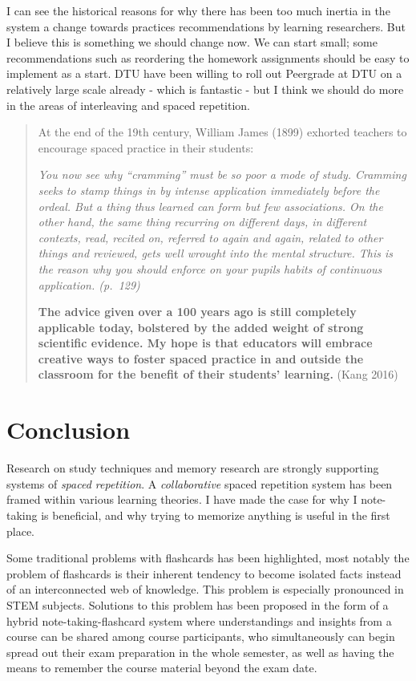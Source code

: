 I can see the historical reasons for why there has been too much inertia
in the system a change towards practices recommendations by learning
researchers. But I believe this is something we should change now. We
can start small; some recommendations such as reordering the homework
assignments should be easy to implement as a start. DTU have been
willing to roll out Peergrade at DTU on a relatively large scale already
- which is fantastic - but I think we should do more in the areas of
interleaving and spaced repetition.

\begin{quote}
At the end of the 19th century, William James (1899) exhorted teachers
to encourage spaced practice in their students:

\emph{You now see why ``cramming'' must be so poor a mode of study.
Cramming seeks to stamp things in by intense application immediately
before the ordeal. But a thing thus learned can form but few
associations. On the other hand, the same thing recurring on different
days, in different contexts, read, recited on, referred to again and
again, related to other things and reviewed, gets well wrought into the
mental structure. This is the reason why you should enforce on your
pupils habits of continuous application. (p.~129)}

\textbf{The advice given over a 100 years ago is still completely
applicable today, bolstered by the added weight of strong scientific
evidence. My hope is that educators will embrace creative ways to foster
spaced practice in and outside the classroom for the benefit of their
students' learning.} (Kang 2016)
\end{quote}

\section{Conclusion}\label{conclusion}

Research on study techniques and memory research are strongly supporting
systems of \emph{spaced repetition}. A \emph{collaborative} spaced
repetition system has been framed within various learning theories. I
have made the case for why I note-taking is beneficial, and why trying
to memorize anything is useful in the first place.

Some traditional problems with flashcards has been highlighted, most
notably the problem of flashcards is their inherent tendency to become
isolated facts instead of an interconnected web of knowledge. This
problem is especially pronounced in STEM subjects. Solutions to this
problem has been proposed in the form of a hybrid note-taking-flashcard
system where understandings and insights from a course can be shared
among course participants, who simultaneously can begin spread out their
exam preparation in the whole semester, as well as having the means to
remember the course material beyond the exam date.


